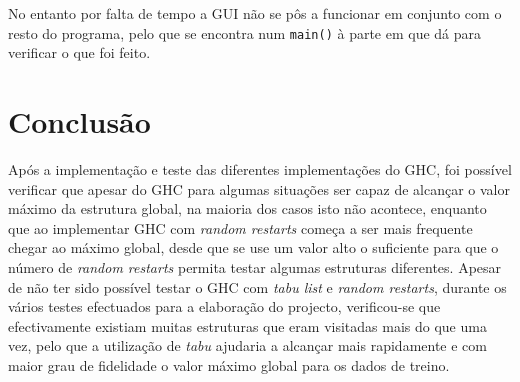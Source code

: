 \documentclass[a4paper]{article}
\begin{document}
    No entanto por falta de tempo a GUI não se pôs a funcionar em conjunto com o resto do programa, pelo que se encontra num \texttt{main()} à parte em que dá para verificar o que foi feito.
    


	\section{Conclusão}
	
    Após a implementação e teste das diferentes implementações do GHC, foi possível verificar que apesar do GHC para algumas situações ser capaz de alcançar o valor máximo da estrutura global, na maioria dos casos isto não acontece, enquanto que ao implementar GHC com \textit{random restarts} começa a ser mais frequente chegar ao máximo global, desde que se use um valor alto o suficiente para que o número de \textit{random restarts} permita testar algumas estruturas diferentes. Apesar de não ter sido possível testar o GHC com \textit{tabu list}  e \textit{random restarts}, durante os vários testes efectuados para a elaboração do projecto, verificou-se que efectivamente existiam muitas estruturas que eram visitadas mais do que uma vez, pelo que a utilização de \textit{tabu} ajudaria a alcançar mais rapidamente e com maior grau de fidelidade o valor máximo global para os dados de treino.
\end{document}
